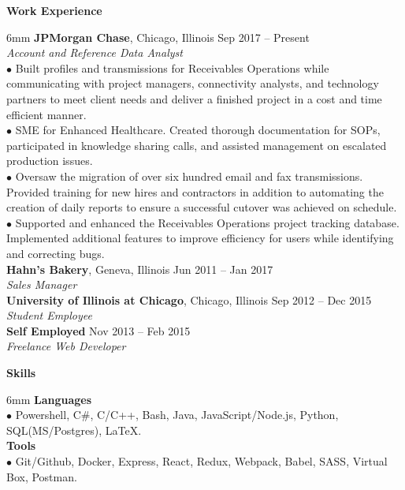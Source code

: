 \documentclass[11pt]{article}
\newcommand{\sectionheader}[1]{\noindent \textbf{\large #1}}
\newenvironment{sectionbody}{\begin{adjustwidth}{6mm}{}}{\end{adjustwidth}}
\begin{document}
\vspace{2mm}

\sectionheader{Work Experience}
\begin{sectionbody}
{\bf JPMorgan Chase}, Chicago, Illinois \hfill Sep 2017 -- Present \\
\textit{Account and Reference Data Analyst} \\
$\bullet$ Built profiles and transmissions for Receivables Operations while communicating with project managers, connectivity analysts, and technology partners to meet client needs and deliver a finished project in a cost and time efficient manner. \\
$\bullet$ SME for Enhanced Healthcare. Created thorough documentation for SOPs, participated in knowledge sharing calls, and assisted management on escalated production issues. \\
$\bullet$ Oversaw the migration of over six hundred email and fax transmissions. Provided training for new hires and contractors in addition to automating the creation of daily reports to ensure a successful cutover was achieved on schedule. \\
$\bullet$ Supported and enhanced the Receivables Operations project tracking database. Implemented additional features to improve efficiency for users while identifying and correcting bugs. \\%
{\bf Hahn's Bakery}, Geneva, Illinois \hfill Jun 2011 -- Jan 2017 \\
\textit{Sales Manager} \\
{\bf University of Illinois at Chicago}, Chicago, Illinois \hfill Sep 2012 -- Dec 2015 \\
\textit{Student Employee} \\
{\bf Self Employed} \hfill Nov 2013 -- Feb 2015 \\
\textit{Freelance Web Developer}
\end{sectionbody}

\vspace{2mm}

\sectionheader{Skills}
\begin{sectionbody}
{\bf Languages} \\
$\bullet$ Powershell, C\#, C/C++, Bash, Java, JavaScript/Node.js, Python, SQL(MS/Postgres), \LaTeX. \\
{\bf Tools} \\
$\bullet$ Git/Github, Docker, Express, React, Redux, Webpack, Babel, SASS, Virtual Box, Postman.
\end{sectionbody}
\end{document}
